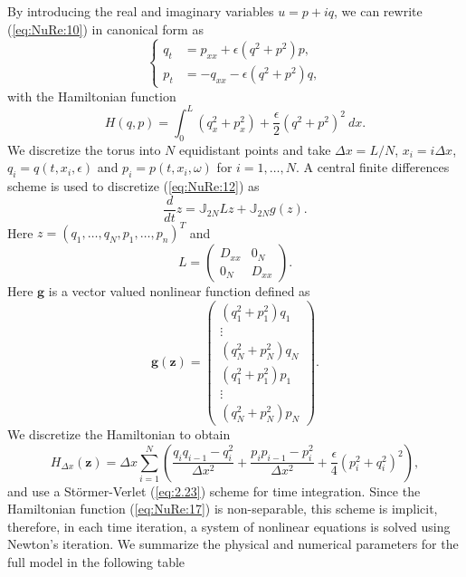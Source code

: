 By introducing the real and imaginary variables $u = p + iq$, we can rewrite (\ref{eq:NuRe:10}) in canonical form as
\begin{equation} \label{eq:NuRe:12}
\left\{
\begin{aligned}
 q_t &= p_{xx} + \epsilon (q^2+p^2)p, \\
 p_t &= -q_{xx} - \epsilon (q^2 + p^2)q,
\end{aligned}
\right.
\end{equation}
with the Hamiltonian function
\begin{equation} \label{eq:NuRe:13}
	H(q,p) = \int_{0}^{L} (q_x^2 + p_x^2) + \frac \epsilon 2 (q^2 + p^2)^2\ dx.
\end{equation}
We discretize the torus into $N$ equidistant points and take $\Delta x = L/N$, $x_i = i\Delta x$, $q_i=q(t,x_i,\epsilon)$ and $p_i = p(t,x_i,\omega)$ for $i = 1 ,\dots,N$. A central finite differences scheme is used to discretize (\ref{eq:NuRe:12}) as
\begin{equation}  \label{eq:NuRe:14}
	\frac{d}{dt} z = \mathbb J_{2N} Lz + \mathbb J_{2N} g(z).
\end{equation}
Here $z = (q_1,\dots,q_N,p_1,\dots,p_n)^T$ and
\begin{equation}  \label{eq:NuRe:15}
	L = 
	\begin{pmatrix}
		D_{xx} & 0_N \\
		0_N & D_{xx}
	\end{pmatrix}.
\end{equation}
Here $\mathbf g$ is a vector valued nonlinear function defined as
\begin{equation}  \label{eq:NuRe:16}
	\mathbf g(\mathbf z) =
	\begin{pmatrix}
	(q_1^2 + p_1^2)q_1 \\
	\vdots \\
	(q_N^2 + p_N^2)q_N \\
	(q_1^2 + p_1^2)p_1 \\
	\vdots \\
	(q_N^2 + p_N^2)p_N
	\end{pmatrix}.
\end{equation}
We discretize the Hamiltonian to obtain
\begin{equation}  \label{eq:NuRe:17}
	H_{\Delta x}(\mathbf z) = {\Delta x}\sum_{i=1}^{N} \left( \frac{q_i q_{i-1} - q_i^2}{\Delta x ^2} + \frac{p_i p_{i-1} - p_i^2}{\Delta x ^2} + \frac \epsilon 4 (p_i^2 + q_i^2)^2  \right),
\end{equation}
and use a St\"ormer-Verlet (\ref{eq:2.23}) scheme for time integration. Since the Hamiltonian function (\ref{eq:NuRe:17}) is non-separable, this scheme is implicit, therefore, in each time iteration, a system of nonlinear equations is solved using Newton's iteration. We summarize the physical and numerical parameters for the full model in the following table

